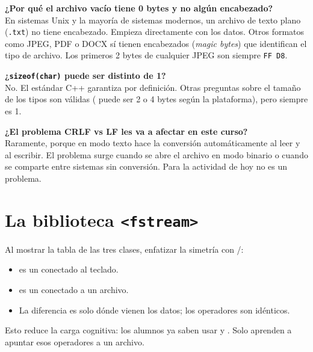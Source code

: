 \documentclass[12pt, oneside]{article}
\begin{document}
\begin{notaprofesor}

  \textbf{¿Por qué el archivo vacío tiene 0 bytes y no algún encabezado?}\\
  En sistemas Unix y la mayoría de sistemas modernos, un archivo de texto
  plano (\texttt{.txt}) no tiene encabezado.  Empieza directamente con los
  datos.  Otros formatos como JPEG, PDF o DOCX sí tienen encabezados
  (\textit{magic bytes}) que identifican el tipo de archivo.  Los primeros
  2 bytes de cualquier JPEG son siempre \texttt{FF D8}.

  \medskip
  \textbf{¿\texttt{sizeof(char)} puede ser distinto de 1?}\\
  No.  El estándar C++ garantiza  por definición.
  Otras preguntas sobre el tamaño de los tipos son válidas ( puede
  ser 2 o 4 bytes según la plataforma), pero  siempre es 1.

  \medskip
  \textbf{¿El problema CRLF vs LF les va a afectar en este curso?}\\
  Raramente, porque  en modo texto hace la conversión
  automáticamente al leer y al escribir.  El problema surge cuando se
  abre el archivo en modo binario o cuando se comparte entre sistemas
  sin conversión.  Para la actividad de hoy no es un problema.

\end{notaprofesor}

\section{La biblioteca \texttt{<fstream>}}

\begin{notaprofesor}
  Al mostrar la tabla de las tres clases, enfatizar la simetría con
  /:
  \begin{itemize}
    \item {} es un  conectado al teclado.
    \item {} es un  conectado a un archivo.
    \item La diferencia es solo dónde vienen los datos; los operadores
          son idénticos.
  \end{itemize}
  Esto reduce la carga cognitiva: los alumnos ya saben usar \cpp{>>} y
  \cpp{<<}.  Solo aprenden a apuntar esos operadores a un archivo.
\end{notaprofesor}
\end{document}
